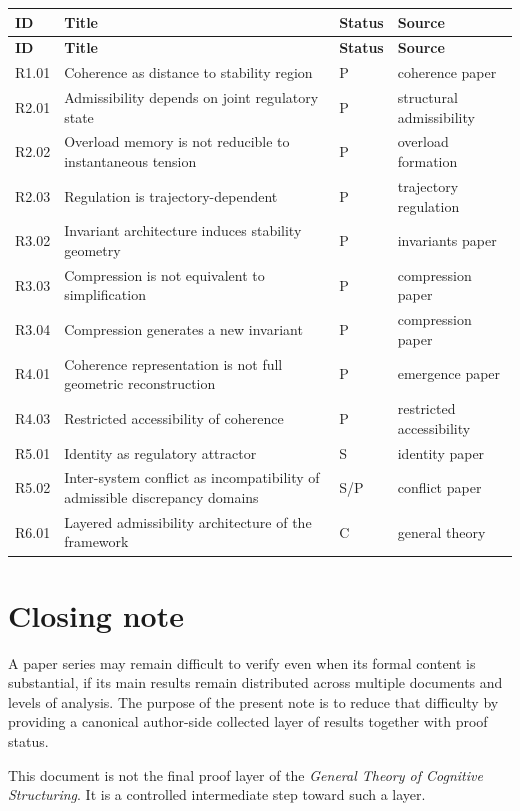 \documentclass[12pt]{article}
\begin{document}
	\begin{longtable}{>{\RaggedRight\arraybackslash}p{}
			>{\RaggedRight\arraybackslash}p{}
			>{\RaggedRight\arraybackslash}p{}
			>{\RaggedRight\arraybackslash}p{}}
		\toprule
		\textbf{ID} & \textbf{Title} & \textbf{Status} & \textbf{Source} \\
		\midrule
		\endfirsthead
		\toprule
		\textbf{ID} & \textbf{Title} & \textbf{Status} & \textbf{Source} \\
		\midrule
		\endhead
		
		R1.01 & Coherence as distance to stability region & P & coherence paper \\
		R2.01 & Admissibility depends on joint regulatory state & P & structural admissibility \\
		R2.02 & Overload memory is not reducible to instantaneous tension & P & overload formation \\
		R2.03 & Regulation is trajectory-dependent & P & trajectory regulation \\
		R3.02 & Invariant architecture induces stability geometry & P & invariants paper \\
		R3.03 & Compression is not equivalent to simplification & P & compression paper \\
		R3.04 & Compression generates a new invariant & P & compression paper \\
		R4.01 & Coherence representation is not full geometric reconstruction & P & emergence paper \\
		R4.03 & Restricted accessibility of coherence & P & restricted accessibility \\
		R5.01 & Identity as regulatory attractor & S & identity paper \\
		R5.02 & Inter-system conflict as incompatibility of admissible discrepancy domains & S/P & conflict paper \\
		R6.01 & Layered admissibility architecture of the framework & C & general theory \\
		\bottomrule
	\end{longtable}
	
	\section{Closing note}
	
	A paper series may remain difficult to verify even when its formal content is substantial, if its
	main results remain distributed across multiple documents and levels of analysis. The purpose of
	the present note is to reduce that difficulty by providing a canonical author-side collected layer
	of results together with proof status.
	
	This document is not the final proof layer of the \emph{General Theory of Cognitive Structuring}.
	It is a controlled intermediate step toward such a layer.
	
\end{document}
